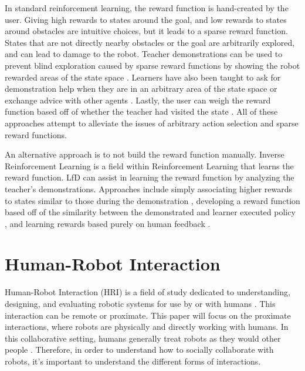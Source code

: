 \documentclass{article}
\begin{document}
In standard reinforcement learning, the reward function is hand-created by the user. Giving high rewards to states around the goal, and low rewards to states around obstacles are intuitive choices, but it leads to a sparse reward function. States that are not directly nearby obstacles or the goal are arbitrarily explored, and can lead to damage to the robot. Teacher demonstrations can be used to prevent blind exploration caused by sparse reward functions by showing the robot rewarded areas of the state space \cite{1014237}. Learners have also been taught to ask for demonstration help when they are in an arbitrary area of the state space \cite{cakmak12hri, Clouse:1997:IAL:897377} or exchange advice with other agents \cite{journals/corr/cs-LG-0203010}. Lastly, the user can weigh the reward function based off of whether the teacher had visited the state \cite{journals/corr/cs-LG-0203010}. All of these approaches attempt to alleviate the issues of arbitrary action selection and sparse reward functions. 

An alternative approach is to not build the reward function manually. Inverse Reinforcement Learning is a field within Reinforcement Learning that learns the reward function. LfD can assist in learning the reward function by analyzing the teacher's demonstrations. Approaches include simply associating higher rewards to states similar to those during the demonstration \cite{Atkeson97robotlearning}, developing a reward function based off of the similarity between the demonstrated and learner executed policy \cite{4399220}, and learning rewards based purely on human feedback \cite{Thomaz:2006:RLH:1597538.1597696}.


\section{Human-Robot Interaction}

Human-Robot Interaction (HRI) is a field of study dedicated to understanding, designing, and evaluating robotic systems for use by or with humans \cite{Goodrich:2007:HIS:1348099.1348100}. This interaction can be remote or proximate. This paper will focus on the proximate interactions, where robots are physically and directly working with humans. In this collaborative setting, humans generally treat robots as they would other people \cite{Reeves:1996:MEP:236605}. Therefore, in order to understand how to socially collaborate with robots, it's important to understand the different forms of interactions. 
\end{document}
